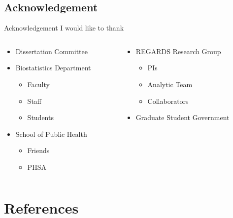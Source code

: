 \documentclass[
  ignorenonframetext,
  aspectratio=169]{beamer}
\providecommand{\tightlist}{%
  \setlength{\itemsep}{0pt}\setlength{\parskip}{0pt}}
\begin{document}
\hypertarget{acknowledgement}{%
\subsection{Acknowledgement}\label{acknowledgement}}

\begin{frame}{Acknowledgement}
I would like to thank

\begin{columns}[T]
\begin{column}{0.48\textwidth}
\begin{itemize}
\tightlist
\item
  Dissertation Committee
\item
  Biostatistics Department

  \begin{itemize}
  \tightlist
  \item
    Faculty
  \item
    Staff
  \item
    Students
  \end{itemize}
\item
  School of Public Health

  \begin{itemize}
  \tightlist
  \item
    Friends
  \item
    PHSA
  \end{itemize}
\end{itemize}
\end{column}

\begin{column}{0.48\textwidth}
\begin{itemize}
\tightlist
\item
  REGARDS Research Group

  \begin{itemize}
  \tightlist
  \item
    PIs
  \item
    Analytic Team
  \item
    Collaborators
  \end{itemize}
\item
  Graduate Student Government
\end{itemize}
\end{column}
\end{columns}
\end{frame}

\hypertarget{references}{%
\section*{References}\label{references}}
\end{document}
